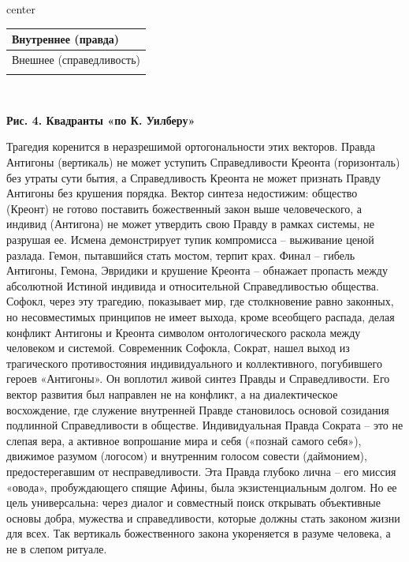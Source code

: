     \begin{adjustbox}{center}\begin{tabular}{ |l| }
      \hline
      {\centering Внутреннее (правда) \par} \\
      \hline
      {\centering Внешнее (справедливость) \par} \\
      \hline
       \\
      \hline
    \end{tabular}\end{adjustbox}\
    {\centering \textbf{Рис. 4. Квадранты «по К. Уилберу»} \par}

    Трагедия коренится в неразрешимой ортогональности этих векторов. Правда Антигоны (вертикаль) не может уступить Справедливости Креонта (горизонталь) без утраты сути бытия, а Справедливость Креонта не может признать Правду Антигоны без крушения порядка. Вектор синтеза недостижим: общество (Креонт) не готово поставить божественный закон выше человеческого, а индивид (Антигона) не может утвердить свою Правду в рамках системы, не разрушая ее. Исмена демонстрирует тупик компромисса – выживание ценой разлада. Гемон, пытавшийся стать мостом, терпит крах. Финал – гибель Антигоны, Гемона, Эвридики и крушение Креонта – обнажает пропасть между абсолютной Истиной индивида и относительной Справедливостью общества. Софокл, через эту трагедию, показывает мир, где столкновение равно законных, но несовместимых принципов не имеет выхода, кроме всеобщего распада, делая конфликт Антигоны и Креонта символом онтологического раскола между человеком и системой.
    Современник Софокла, Сократ, нашел выход из трагического противостояния индивидуального и коллективного, погубившего героев «Антигоны». Он воплотил живой синтез Правды и Справедливости. Его вектор развития был направлен не на конфликт, а на диалектическое восхождение, где служение внутренней Правде становилось основой созидания подлинной Справедливости в обществе. Индивидуальная Правда Сократа – это не слепая вера, а активное вопрошание мира и себя («познай самого себя»), движимое разумом (логосом) и внутренним голосом совести (даймонием), предостерегавшим от несправедливости. Эта Правда глубоко лична – его миссия «овода», пробуждающего спящие Афины, была экзистенциальным долгом. Но ее цель универсальна: через диалог и совместный поиск открывать объективные основы добра, мужества и справедливости, которые должны стать законом жизни для всех. Так вертикаль божественного закона укореняется в разуме человека, а не в слепом ритуале.
